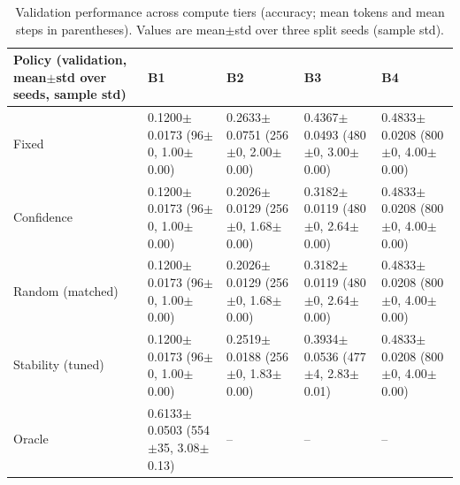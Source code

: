 \begin{table}[t]
\centering
\small
\setlength{\tabcolsep}{3pt}
\renewcommand{\arraystretch}{1.1}
\begin{tabularx}{\textwidth}{lYYYY}
\toprule
Policy (validation, mean$\pm$std over seeds, sample std) & B1 & B2 & B3 & B4 \\
\midrule
Fixed & 0.1200$\pm$0.0173 (96$\pm$0, 1.00$\pm$0.00) & 0.2633$\pm$0.0751 (256$\pm$0, 2.00$\pm$0.00) & 0.4367$\pm$0.0493 (480$\pm$0, 3.00$\pm$0.00) & 0.4833$\pm$0.0208 (800$\pm$0, 4.00$\pm$0.00) \\
\addlinespace
Confidence & 0.1200$\pm$0.0173 (96$\pm$0, 1.00$\pm$0.00) & 0.2026$\pm$0.0129 (256$\pm$0, 1.68$\pm$0.00) & 0.3182$\pm$0.0119 (480$\pm$0, 2.64$\pm$0.00) & 0.4833$\pm$0.0208 (800$\pm$0, 4.00$\pm$0.00) \\
Random (matched) & 0.1200$\pm$0.0173 (96$\pm$0, 1.00$\pm$0.00) & 0.2026$\pm$0.0129 (256$\pm$0, 1.68$\pm$0.00) & 0.3182$\pm$0.0119 (480$\pm$0, 2.64$\pm$0.00) & 0.4833$\pm$0.0208 (800$\pm$0, 4.00$\pm$0.00) \\
Stability (tuned) & 0.1200$\pm$0.0173 (96$\pm$0, 1.00$\pm$0.00) & 0.2519$\pm$0.0188 (256$\pm$0, 1.83$\pm$0.00) & 0.3934$\pm$0.0536 (477$\pm$4, 2.83$\pm$0.01) & 0.4833$\pm$0.0208 (800$\pm$0, 4.00$\pm$0.00) \\
Oracle & 0.6133$\pm$0.0503 (554$\pm$35, 3.08$\pm$0.13) & -- & -- & -- \\
\bottomrule
\end{tabularx}
\caption{Validation performance across compute tiers (accuracy; mean tokens and mean steps in parentheses). Values are mean$\pm$std over three split seeds (sample std).}
\label{tab:router_boolq}
\end{table}
